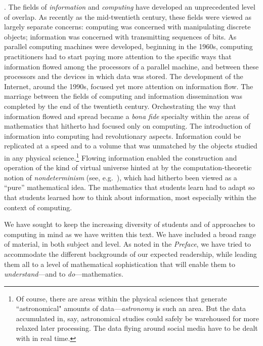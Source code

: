  
.
The fields of {\it information} and {\em computing} have developed an unprecedented level of overlap.  As recently as the mid-twentieth century, these fields were viewed as largely separate concerns: computing was concerned with manipulating discrete objects; information was concerned with transmitting sequences of bits.  As parallel computing machines were developed, beginning in the 1960s, computing practitioners had to start paying more attention to the specific ways that information flowed among the processors of a parallel machine, and between these processors and the devices in which data was stored.  The development of the Internet, around the 1990s, focused yet more attention on information flow.  The marriage between the fields of computing and information dissemination was completed by the end of the twentieth century.  Orchestrating the way that information flowed and spread became a {\it bona fide} specialty within the areas of mathematics that hitherto had focused only on computing.  The introduction of information into computing had revolutionary aspects.  Information could be replicated at a speed and to a volume that was unmatched by the objects studied in any physical science.\footnote{Of course, there are areas within the  physical sciences that generate ``astronomical" amounts of data---{\it astronomy} is such an area.  But the data accumulated in, say, astronomical studies could safely be warehoused for more relaxed later processing.  The data flying around social media have to be dealt with in real time.}  Flowing information enabled the construction and operation of the kind of virtual universe hinted at by the computation-theoretic notion of {\it nondeterminism}  (see, e.g.~\cite{Rosenberg09}), which had hitherto been viewed as a ``pure'' mathematical idea.  The mathematics that students learn had to adapt so that students learned how to think about information, most especially within the context of computing.

\bigskip

We have sought to keep the increasing diversity of students and of approaches to computing in mind as we have written this text.  We have included a broad range of material, in both subject and level.  As noted in the {\it Preface}, we have tried to accommodate the different backgrounds of our expected readership, while leading them all to a level of mathematical sophistication that will enable them to {\em understand}---and to {\em do}---mathematics.

